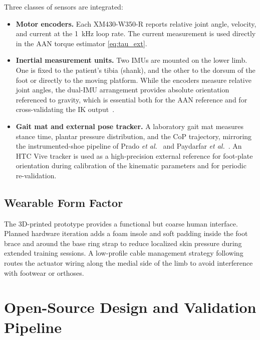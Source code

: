 \documentclass[conference]{IEEEtran}
\begin{document}
Three classes of sensors are integrated:
\begin{itemize}
\item \textbf{Motor encoders.} Each XM430-W350-R reports relative joint angle, velocity, and current at the 1~kHz loop rate. The current measurement is used directly in the AAN torque estimator \eqref{eq:tau_ext}.
\item \textbf{Inertial measurement units.} Two IMUs are mounted on the lower limb. One is fixed to the patient's tibia (shank), and the other to the dorsum of the foot or directly to the moving platform. While the encoders measure relative joint angles, the dual-IMU arrangement provides absolute orientation referenced to gravity, which is essential both for the AAN reference and for cross-validating the IK output~\cite{yue2018wearable}.
\item \textbf{Gait mat and external pose tracker.} A laboratory gait mat measures stance time, plantar pressure distribution, and the CoP trajectory, mirroring the instrumented-shoe pipeline of Prado \emph{et al.}~\cite{prado2020fog} and Paydarfar \emph{et al.}~\cite{paydarfar2020rnn}. An HTC Vive tracker is used as a high-precision external reference for foot-plate orientation during calibration of the kinematic parameters and for periodic re-validation.
\end{itemize}

\subsection{Wearable Form Factor}

The 3D-printed prototype provides a functional but coarse human interface. Planned hardware iteration adds a foam insole and soft padding inside the foot brace and around the base ring strap to reduce localized skin pressure during extended training sessions. A low-profile cable management strategy following~\cite{yandell2019profile} routes the actuator wiring along the medial side of the limb to avoid interference with footwear or orthoses.

\section{Open-Source Design and Validation Pipeline}
\label{sec:opensource}
\end{document}
